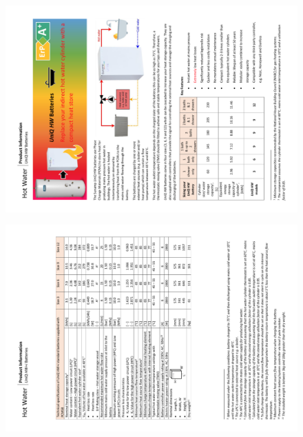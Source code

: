 \begin{figure}
	\centering
	\includegraphics[height=0.48\textheight]{Appendices/1_PIS_HW_01.png}
\end{figure}



\newpage
\begin{figure}
	\centering
	\includegraphics[height=0.48\textheight]{Appendices/2_PIS_HW+i_02.png}
\end{figure}

